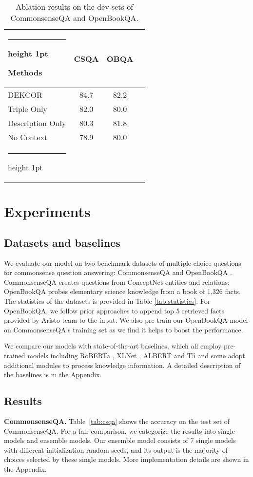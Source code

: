 \documentclass[11pt,a4paper]{article}
\makeatletter
\newcommand{\thickhline}{\noalign {\ifnum 0=`}\fi \hrule height 1pt
    \futurelet \reserved@a \@xhline
}
\makeatother
\begin{document}
\begin{table}[t]
\centering
\caption{Ablation results on the dev sets of CommonsenseQA and OpenBookQA.}
\label{tab:ablation}
\begin{tabular}{lccc}
\thickhline
\textbf{Methods}& \textbf{CSQA} & \textbf{OBQA}\\
\hline
DEKCOR & 84.7 & 82.2\\
Triple Only & 82.0 & 80.0 \\
Description Only & 80.3 & 81.8\\
No Context & 78.9 & 80.0\\
\thickhline
\end{tabular}
\end{table}


\section{Experiments}
\label{sec:exp}
\subsection{Datasets and baselines}
We evaluate our model on two benchmark datasets of multiple-choice questions for commonsense question answering: CommonsenseQA \citep{csqa} and OpenBookQA \citep{mihaylov2018can}. CommonsenseQA creates questions from ConceptNet entities and relations; OpenBookQA probes elementary science knowledge from a book of 1,326 facts. The statistics of the datasets is provided in Table \ref{tab:statistics}. For OpenBookQA, we follow prior approaches \citep{wang2020connecting} to append top 5 retrieved facts provided by Aristo team \citep{clark2019f} to the input. We also pre-train our OpenBookQA model on CommonsenseQA's training set as we find it helps to boost the performance.


We compare our models with state-of-the-art baselines, which all employ pre-trained models including RoBERTa \cite{roberta}, XLNet \cite{xlnet}, ALBERT \cite{ALBERT} and T5 \cite{t5} and some adopt additional modules to process knowledge information. A detailed description of the baselines is in the Appendix.



\subsection{Results}
\textbf{CommonsenseQA.} Table~\ref{tab:csqa} shows the accuracy on the test set of CommonsenseQA. For a fair comparison, we categorize the results into single models and ensemble models. Our ensemble model consists of 7 single models with different initialization random seeds, and its output is the majority of choices selected by these single models. More implementation details are shown in the Appendix.
\end{document}
